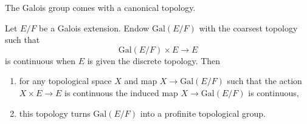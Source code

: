 \noindent
The Galois group comes with a canonical topology.

\begin{lemma}
\label{lemma-galois-profinite}
Let $E/F$ be a Galois extension. Endow $\text{Gal}(E/F)$ with the coarsest
topology such that
$$
\text{Gal}(E/F) \times E \longrightarrow E
$$
is continuous when $E$ is given the discrete topology. Then
\begin{enumerate}
\item for any topological space $X$ and map $X \to \text{Gal}(E/F)$
such that the action $X \times E \to E$ is continuous the induced map
$X \to \text{Gal}(E/F)$ is continuous,
\item this topology turns $\text{Gal}(E/F)$ into
a profinite topological group.
\end{enumerate}
\end{lemma}

